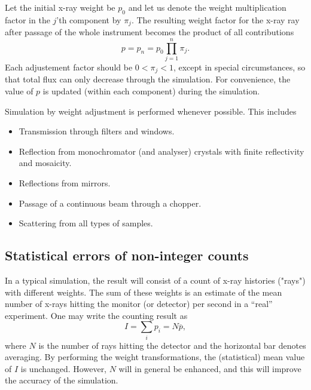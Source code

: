 Let the initial x-ray weight be $p_0$ and let us denote the weight
multiplication factor in the $j$'th component by $\pi_j$.  The resulting
weight factor for the x-ray ray after passage of the whole instrument
becomes the product of all contributions
\begin{equation}
\label{e:probprod}
p = p_n = p_0 \prod_{j=1}^n \pi_j .
\end{equation}
Each adjustement factor should be $0 < \pi_j < 1$, except in special circumstances, so that total flux can only decrease through the simulation. For convenience, the value of $p$ is updated (within each component)
during the simulation.

Simulation by weight adjustment is performed
whenever possible. This includes
\begin{itemize}
\item Transmission through filters and windows.
\item Reflection from monochromator (and analyser) crystals
 with finite reflectivity and mosaicity.
\item Reflections from mirrors.
\item Passage of a continuous beam through a chopper.
\item Scattering from all types of samples.
\end{itemize}

\subsection{Statistical errors of non-integer counts}
\label{s:staterror}

In a typical simulation, the result will consist of a
count of x-ray histories ("rays") with different weights. The
sum of these weights is an estimate of the mean number of x-rays
hitting the monitor (or detector) per second in a ``real'' experiment.
One may write the counting result as
\begin{equation}
\label{psum}
I = \sum_i p_i = N \overline{p} ,
\end{equation}
where $N$ is the number of rays hitting the detector and the horizontal bar
denotes averaging.
By performing the weight transformations, the (statistical)
mean value of $I$ is unchanged. However, $N$ will in general be enhanced,
and this will improve the accuracy of the simulation.

